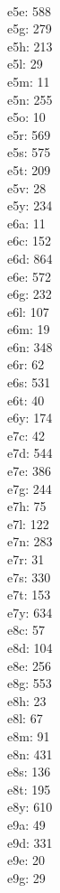 \begin{multicols}{8}
  \\e5e: 588
  \\e5g: 279
  \\e5h: 213
  \\e5l: 29
  \\e5m: 11
  \\e5n: 255
  \\e5o: 10
  \\e5r: 569
  \\e5s: 575
  \\e5t: 209
  \\e5v: 28
  \\e5y: 234
  \\e6a: 11
  \\e6c: 152
  \\e6d: 864
  \\e6e: 572
  \\e6g: 232
  \\e6l: 107
  \\e6m: 19
  \\e6n: 348
  \\e6r: 62
  \\e6s: 531
  \\e6t: 40
  \\e6y: 174
  \\e7c: 42
  \\e7d: 544
  \\e7e: 386
  \\e7g: 244
  \\e7h: 75
  \\e7l: 122
  \\e7n: 283
  \\e7r: 31
  \\e7s: 330
  \\e7t: 153
  \\e7y: 634
  \\e8c: 57
  \\e8d: 104
  \\e8e: 256
  \\e8g: 553
  \\e8h: 23
  \\e8l: 67
  \\e8m: 91
  \\e8n: 431
  \\e8s: 136
  \\e8t: 195
  \\e8y: 610
  \\e9a: 49
  \\e9d: 331
  \\e9e: 20
  \\e9g: 29

\end{multicols}
